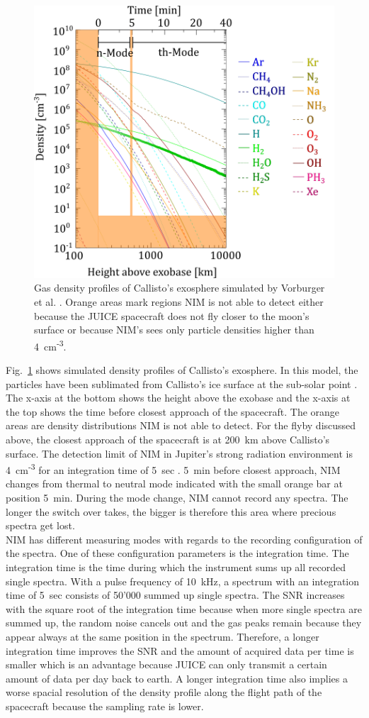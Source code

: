	\begin{figure}[h!]
		\centering
		\includegraphics[width=.7\textwidth]{Bilder/Vorburger_Icarus_2015.png}
		\caption{Gas density profiles of Callisto's exosphere simulated by Vorburger et al. \cite{Vorburger2015}. Orange areas mark regions NIM is not able to detect either because the JUICE spacecraft does not fly closer to the moon's surface or because NIM's sees only particle densities higher than 4~cm\textsuperscript{-3}.}
		\label{fig:VorburgIc2015}
	\end{figure}
	Fig.~\ref{fig:VorburgIc2015} shows simulated density profiles of Callisto's exosphere. In this model, the particles have been sublimated from Callisto's ice surface at the sub-solar point \cite{Vorburger2015}. The x-axis at the bottom shows the height above the exobase and the x-axis at the top shows the time before closest approach of the spacecraft. The orange areas are density distributions NIM is not able to detect. For the flyby discussed above, the closest approach of the spacecraft is at 200~km above Callisto's surface. The detection limit of NIM in Jupiter's strong radiation environment is 4~cm\textsuperscript{-3} for an integration time of 5~sec \cite{Lasi_2017_Detector}. 5~min before closest approach, NIM changes from thermal to neutral mode indicated with the small orange bar at position 5~min. During the mode change, NIM cannot record any spectra. The longer the switch over takes, the bigger is therefore this area where precious spectra get lost.\\
	NIM has different measuring modes with regards to the recording configuration of the spectra. One of these configuration parameters is the integration time. The integration time is the time during which the instrument sums up all recorded single spectra. With a pulse frequency of 10~kHz, a spectrum with an integration time of 5~sec consists of 50'000 summed up single spectra. The SNR increases with the square root of the integration time because when more single spectra are summed up, the random noise cancels out and the gas peaks remain because they appear always at the same position in the spectrum.	Therefore, a longer integration time improves the SNR and the amount of acquired data per time is smaller which is an advantage because JUICE can only transmit a certain amount of data per day back to earth. A longer integration time also implies a worse spacial resolution of the density profile along the flight path of the spacecraft because the sampling rate is lower.\\
